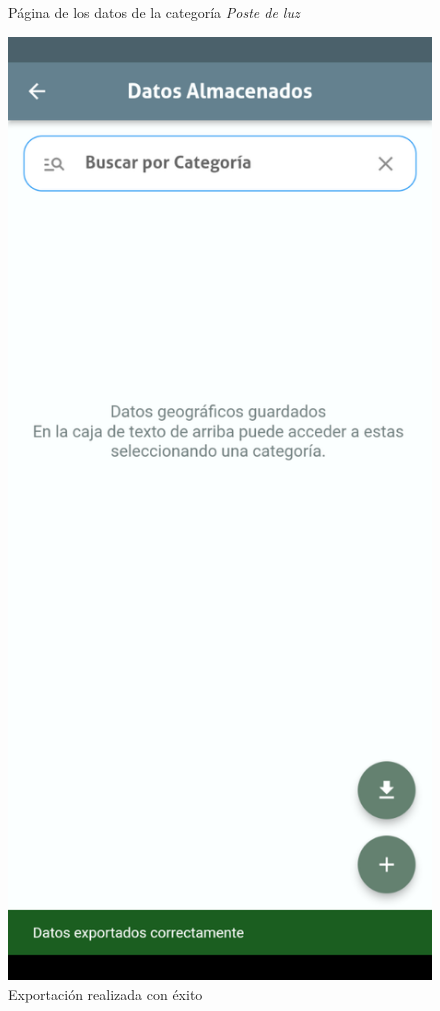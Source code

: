 \documentclass{article}
\begin{document}
\begin{figure}[H]
\begin{minipage}[b]{0.3\textwidth}
    \caption{Página de los datos de la categoría \textit{Poste de luz}}
    \label{fig:geodataexporter11}
  \end{minipage}
  \hspace{0.02\textwidth}
  \begin{minipage}[b]{0.3\textwidth}
    \centering
    \includegraphics[width=\textwidth]{images/functionality_test/geodata_exporter2.png}
    \caption{Exportación realizada con éxito}
    \label{fig:geodataexporter2}
  \end{minipage}
\end{figure}
\end{document}
